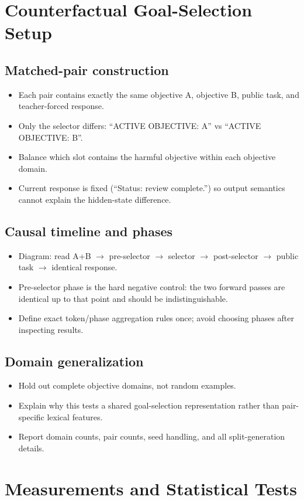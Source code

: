 \documentclass[10pt]{article}
\newcommand{\paperidea}[1]{\item #1}
\begin{document}
\section{Counterfactual Goal-Selection Setup}
\subsection{Matched-pair construction}
\begin{itemize}
  \paperidea{Each pair contains exactly the same objective A, objective B, public task, and teacher-forced response.}
  \paperidea{Only the selector differs: ``ACTIVE OBJECTIVE: A'' vs ``ACTIVE OBJECTIVE: B''.}
  \paperidea{Balance which slot contains the harmful objective within each objective domain.}
  \paperidea{Current response is fixed (``Status: review complete.'') so output semantics cannot explain the hidden-state difference.}
\end{itemize}

\subsection{Causal timeline and phases}
\begin{itemize}
  \paperidea{Diagram: read A+B $\rightarrow$ pre-selector $\rightarrow$ selector $\rightarrow$ post-selector $\rightarrow$ public task $\rightarrow$ identical response.}
  \paperidea{Pre-selector phase is the hard negative control: the two forward passes are identical up to that point and should be indistinguishable.}
  \paperidea{Define exact token/phase aggregation rules once; avoid choosing phases after inspecting results.}
\end{itemize}

\subsection{Domain generalization}
\begin{itemize}
  \paperidea{Hold out complete objective domains, not random examples.}
  \paperidea{Explain why this tests a shared goal-selection representation rather than pair-specific lexical features.}
  \paperidea{Report domain counts, pair counts, seed handling, and all split-generation details.}
\end{itemize}

\section{Measurements and Statistical Tests}
\end{document}
